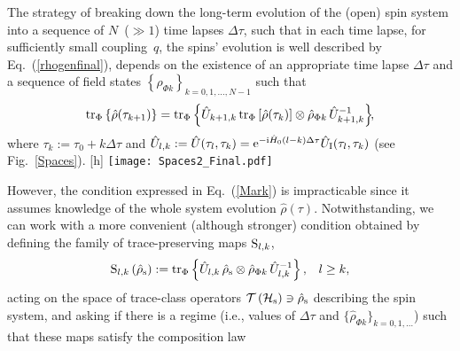 \documentclass[]{nature}
\makeatletter
\renewenvironment{figure}
               {\@float{figure}}
               {\end@float}
\makeatother
\begin{document}
{The strategy of breaking down the long-term evolution of the  (open) spin system
into a sequence 
of $N$~($\gg 1$) time lapses $\Delta \tau$, such that in each time lapse, for sufficiently small coupling~$q$, 
the spins' evolution is
well described by Eq.~(\ref{rhogenfinal}),
depends on the existence of an
appropriate time lapse $\Delta \tau$ and a sequence of field states $\left\{\hat \rho_{\Phi {k}}\right\}_{{k}=0,1,\dots,N-1}$ such that
\begin{eqnarray}
{\rm tr}_\Phi \left\{
\hat\rho(\tau_{k+1}) \right\} =
{\rm tr}_\Phi \left\{\hat U_{k+1,k} \,{\rm tr}_\Phi \left[
\hat\rho(\tau_k)
\right]\otimes \hat\rho_{\Phi k}\,
\hat U_{k+1,k}^{-1}
\right\}\!\!,
\label{Mark}
\end{eqnarray}
where
$\tau_k := \tau_0+k \Delta \tau$ and $\hat U_{l,k}:=\hat U(\tau_l,\tau_k)= {\rm e}^{-{\rm i}\hat H_0 (l-k)\Delta \tau}\hat U_{\rm I}(\tau_l,\tau_k)$
(see Fig.~\ref{Spaces}). 
\begin{figure}[h]
\texttt{[image: Spaces2\_Final.pdf]}
\caption{Markovian regime and the evolution of the reduced density operator. This is a schematic representation of the
condition for the validity of the Markovian regime for the evolution of the open spin system. The full  (unitary) evolution in the space of trace-class operators describing the  universe, 
${\cal T}\left({\cal H}_{\rm s}\otimes {\cal H}_\Phi\right)$, must induce discrete dynamical maps ${\rm S}_{k+1,k}$ 
on the space of trace-class operators describing  the spin system,
${\cal T}\left({\cal H}_{\rm s}\right)$, in such a way that, for $m\geq l\geq k$,
${\rm S}_{m,l}\cdot {\rm S}_{l,k}= {\rm S}_{m,k}$ (semigroup property).}
\label{Spaces}
\end{figure}
However, the condition expressed in Eq.~(\ref{Mark}) is impracticable  since it 
assumes knowledge of the whole system evolution
$\hat \rho(\tau)$. 
Notwithstanding, we can work with a more convenient (although stronger) condition 
obtained by
defining the family of trace-preserving  maps ${\rm S}_{l,k}$,
\begin{eqnarray}
{\rm S}_{l,k}\left(\hat \rho_{\rm s}\right):=
{\rm tr}_\Phi \left\{\hat U_{l,k} \,
\hat\rho_{\rm s}\otimes \hat\rho_{\Phi k}\,
\hat U_{l,k}^{-1}
\right\},\;\;\;l\geq k,
\label{Sjk}
\end{eqnarray}
acting on the space of trace-class operators ${\cal T}\left({\cal H}_{\rm s}\right)\ni \hat \rho_{\rm s}$ describing the spin system, and asking if there is a regime (i.e., values of $\Delta \tau$ and 
$\{\hat\rho_{\Phi k}\}_{k=0,1,\dots}$) such that these maps  satisfy the composition law
}
\end{document}
